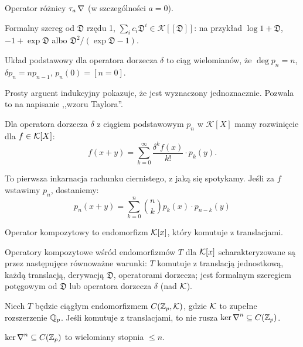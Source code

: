 \begin{przyklad}
	Operator różnicy $\tau_a \operatorname{\nabla}$ (w szczególności $a = 0$).
\end{przyklad}

\begin{przyklad}
	Formalny szereg od $\mathfrak D$ rzędu 1, $\sum_i c_i \mathfrak D^i \in \mathcal K[[\mathfrak D]]$:
	na przykład $\log 1 + \mathfrak D$, $-1 + \exp \mathfrak D$ albo $\mathfrak D^2 /  (\exp \mathfrak D - 1)$.
\end{przyklad}

\begin{definicja}
	Układ podstawowy dla operatora dorzecza $\delta$ to ciąg wielomianów, że $\deg p_n = n$, $\delta p_n = n p_{n-1}$, $p_n(0) = [n = 0]$.
\end{definicja}

Prosty arguent indukcyjny pokazuje, że jest wyznaczony jednoznacznie.
Pozwala to na napisanie ,,wzoru Taylora''.

\begin{fakt}
	Dla operatora dorzecza $\delta$ z ciągiem podstawowym $p_n$ w $\mathcal K[X]$ mamy rozwinięcie dla $f \in \mathcal K[X]$:
	\[
		f(x+y) = \sum_{k=0}^\infty \frac{\delta^k f(x)}{k!} \cdot p_k (y).
	\]
\end{fakt}

To pierwsza inkarnacja rachunku ciernistego, z jaką się spotykamy. Jeśli za $f$ wstawimy $p_n$, dostaniemy:
\[
	p_n(x+y) = \sum_{k=0}^n {n \choose k} p_k(x) \cdot p_{n-k}(y)%
\]

\begin{definicja}
	Operator kompozytowy to endomorfizm $\mathcal K[x]$, który komutuje z translacjami.
\end{definicja}

\begin{fakt}
	Operatory kompozytowe wśród endomorfizmów $T$ dla $\mathcal K[x]$ scharakteryzowane są przez następujęce równoważne warunki: $T$ komutuje z translacją jednostkową, każdą translacją, derywacją $\mathfrak D$, operatorami dorzecza; jest formalnym szeregiem potęgowym od $\mathfrak{D}$ lub operatora dorzecza $\delta$ (nad $\mathcal K$).
\end{fakt}

Niech $T$ będzie ciągłym endomorfizmem $C(\mathbb Z_p,\mathcal K)$, gdzie $\mathcal K$ to zupełne rozszerzenie $\mathbb Q_p$.
Jeśli komutuje z translacjami, to nie rusza $\ker \operatorname{\nabla}^n \subseteq C(\mathbb Z_p)$.

\begin{lemat}
	$\ker \operatorname{\nabla}^n \subseteq C(\mathbb Z_p)$ to wielomiany stopnia $\le n$.
\end{lemat}

